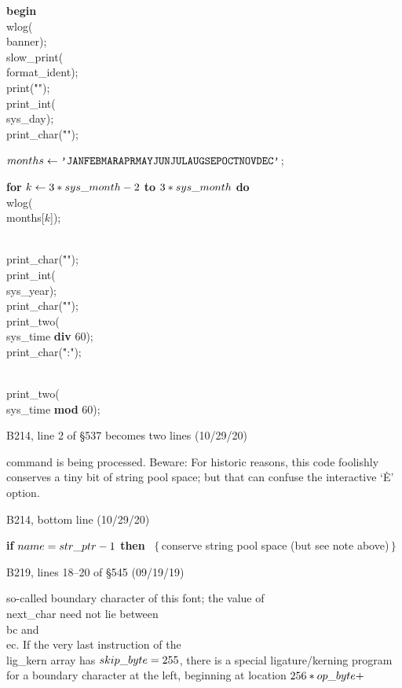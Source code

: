 \ninepoint\noindent\quad
{\bf begin} \\{wlog}(\\{banner});
\\{slow\_print}(\\{format\_ident});
\\{print}(\.{"\]\]"});
\\{print\_int}(\\{sys\_day});
\\{print\_char}(\.{"\]"});\par
\noindent\quad
$\\{months}\gets\.{\char`\'JANFEBMARAPRMAYJUNJULAUGSEPOCTNOVDEC\char`\'}$;\par
\noindent\quad
{\bf for} $k\gets3\ast\\{sys\_month}-2$ {\bf to} $3\ast\\{sys\_month}$
{\bf do} \\{wlog}(\\{months}[$k$]);\par
\noindent\quad
\\{print\_char}(\.{"\]"});
\\{print\_int}(\\{sys\_year});
\\{print\_char}(\.{"\]"});
\\{print\_two}(\\{sys\_time} {\bf div} 60);
\\{print\_char}(\.{":"});\par
\noindent\quad
\\{print\_two}(\\{sys\_time} {\bf mod} 60);

\bugonpage B214, line 2 of \S537 becomes two lines (10/29/20)

\tenpoint\noindent
command is being processed.
Beware: For historic reasons, this code foolishly conserves a tiny bit
of string pool space; but that can confuse the interactive `\.E' option.

\bugonpage B214, bottom line (10/29/20)

\ninepoint\noindent
{\bf if} $\\{name}=\\{str\_ptr}-1$ {\bf then}
\ $\{\,$conserve string pool space (but see note above)$\,\}$

\bugonpage B219, lines 18--20 of \S545 (09/19/19)

\tenpoint\noindent
so-called boundary character of this font;
the value of \\{next\_char} need not lie between \\{bc} and~\\{ec}.
If the very last instruction of the \\{lig\_kern} array has $\\{skip%
\_byte}=255$,
there is a special ligature/kerning program for a boundary character at the
left, beginning at location $256\ast\\{op\_byte}+$\cutpar

